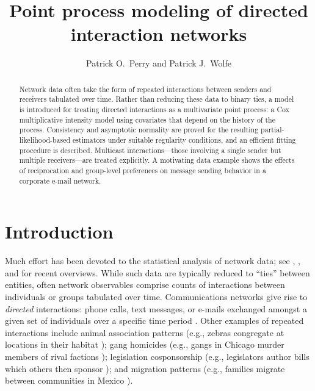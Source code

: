\documentclass[final]{statsoc}
\title[Point Process Modeling of Directed Interaction Networks]{%
    Point process modeling of directed interaction networks
}
\author[P.\ O.\ Perry and P.\ J.\ Wolfe]{%
    Patrick O.\ Perry and Patrick J.\ Wolfe
}
\begin{document}

\begin{abstract}
Network data often take the form of repeated interactions between senders
and receivers tabulated over time.  Rather than reducing these data to
binary ties, a model is introduced for treating directed interactions as a
multivariate point process: a Cox multiplicative intensity model using
covariates that depend on the history of the process.
Consistency and asymptotic normality are proved for the resulting
partial-likelihood-based estimators under suitable regularity
conditions, and an efficient fitting procedure is described.
Multicast interactions---those involving a single sender
but multiple receivers---are treated explicitly.   A motivating data
example shows the effects of reciprocation and group-level preferences
on message sending behavior in a corporate e-mail network.

\end{abstract}


\section{Introduction}
\label{S:introduction}

Much effort has been devoted to the statistical analysis of network data;
see \citet{goldenberg2009survey}, \citet{jackson2008social}, and \citet{kolaczyk2009statistical}
for recent overviews.  While such data are typically reduced to ``ties''
between entities, often network observables comprise counts of interactions
between individuals or groups tabulated over time.  Communications networks
give rise to \emph{directed} interactions: phone calls, text messages, or
e-mails exchanged amongst a given set of individuals over a specific time
period \citep{tyler2005email,eagle2006reality}.  Other examples of repeated
interactions include animal association patterns (e.g., zebras congregate
at locations in their habitat \citep{sundaresan2007network}); gang homicides
(e.g., gangs in Chicago murder members of rival factions
\citep{papachristos2009murder}); legislation cosponsorship (e.g., legislators
author bills which others then sponsor \citep{fowler2006connecting}); and
migration patterns (e.g., families migrate between communities in Mexico
\citep{mckenzie2007network}).
\end{document}
